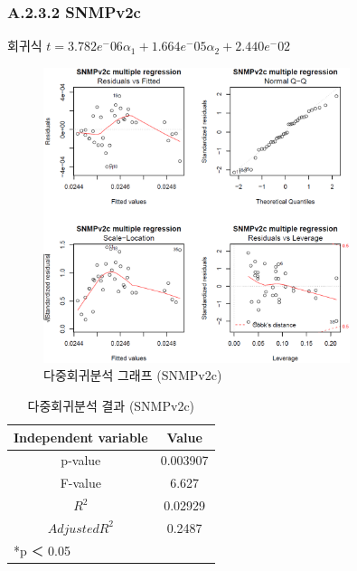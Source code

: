 \documentclass[11pt
  , a4paper
  , article
  , oneside
]{memoir}
\begin{document}
\subsubsection{A.2.3.2 SNMPv2c}
\centering 회귀식 $ t=3.782e^-06\alpha_1 + 1.664e^-05\alpha_2 + 2.440e^-02$ 
   　
\begin{figure}[h!]
  \centering
  \includegraphics[width=0.8\textwidth]{./images/v2c.eps}
  \caption{다중회귀분석 그래프 (SNMPv2c)}
\end{figure}

\begin{table}[!h]
\begin{center}
\begin{tabular}{c|c}\hline
Independent variable & Value  \\ \hline\hline
p-value &  0.003907\\ 
F-value &  6.627\\ 
$  R^2  $ &  0.02929\\ 
$ Adjusted R^2 $ & 0.2487 \\ \hline
\multicolumn{2}{l}{*p ＜ 0.05} \\ \hline\hline
\end{tabular}
\caption{다중회귀분석 결과 (SNMPv2c)}
\end{center}
\end{table} 
\clearpage
\end{document}
